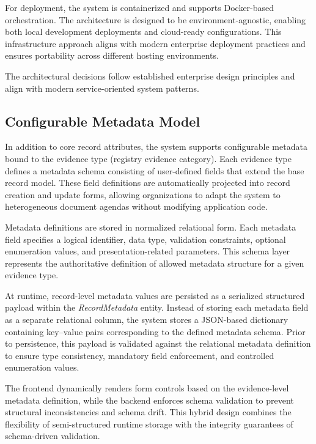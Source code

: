 For deployment, the system is containerized and supports Docker-based orchestration. 
The architecture is designed to be environment-agnostic, enabling both local development deployments and cloud-ready configurations. 
This infrastructure approach aligns with modern enterprise deployment practices and ensures portability across different hosting environments.

The architectural decisions follow established enterprise design principles \cite{fowler,sommerville} and align with modern service-oriented system patterns.

\subsection{Configurable Metadata Model}

In addition to core record attributes, the system supports configurable metadata bound to the evidence type (registry evidence category). 
Each evidence type defines a metadata schema consisting of user-defined fields that extend the base record model. 
These field definitions are automatically projected into record creation and update forms, allowing organizations to adapt the system to heterogeneous document agendas without modifying application code.

Metadata definitions are stored in normalized relational form. 
Each metadata field specifies a logical identifier, data type, validation constraints, optional enumeration values, and presentation-related parameters. 
This schema layer represents the authoritative definition of allowed metadata structure for a given evidence type.

At runtime, record-level metadata values are persisted as a serialized structured payload within the \textit{RecordMetadata} entity. 
Instead of storing each metadata field as a separate relational column, the system stores a JSON-based dictionary containing key--value pairs corresponding to the defined metadata schema. 
Prior to persistence, this payload is validated against the relational metadata definition to ensure type consistency, mandatory field enforcement, and controlled enumeration values.

The frontend dynamically renders form controls based on the evidence-level metadata definition, while the backend enforces schema validation to prevent structural inconsistencies and schema drift. 
This hybrid design combines the flexibility of semi-structured runtime storage with the integrity guarantees of schema-driven validation.

